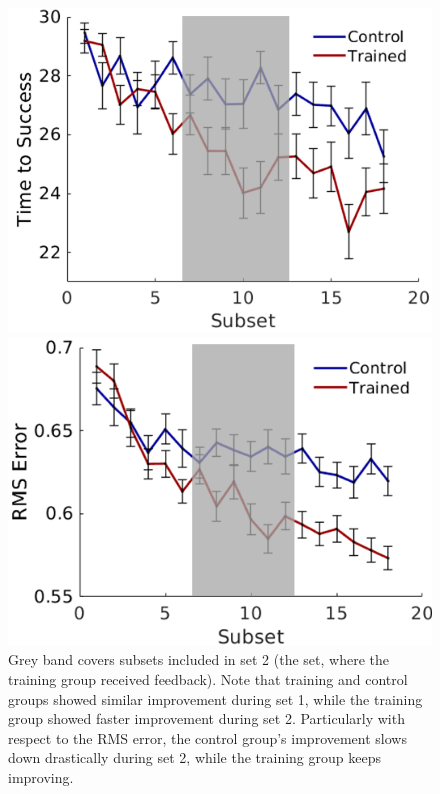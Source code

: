 \documentclass[12pt]{article}
\begin{document}


\begin{figure}[h]
	\begin{center} 
	\begin{multicols}{2}
		\includegraphics[width=0.85\columnwidth]{tts_plateau.png}
		\caption*{}
		\includegraphics[width=0.9\columnwidth]{err_plateau.png}
		\caption*{}
	\end{multicols}
	\end{center}
	\vspace{-1.2cm}
	\caption{Grey band covers subsets included in set 2 (the set, where the training group received feedback). Note that training and control groups showed similar improvement during set 1, while the training group showed faster improvement during set 2. Particularly with respect to the RMS error, the control group's improvement slows down drastically during set 2, while the training group keeps improving.}
	\label{fig: plateau}
\end{figure}
\end{document}
